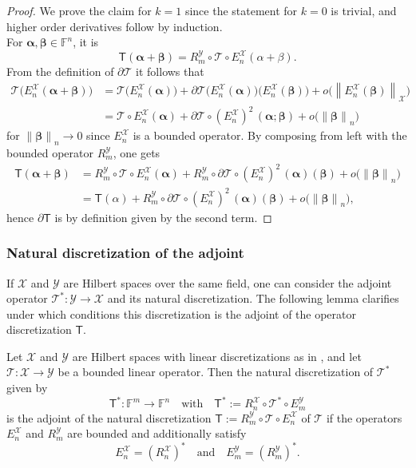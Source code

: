 \documentclass[a4paper]{paper}
\newcommand{\Spc}[1]{\mathscr{#1}}
\newcommand{\Field}{\mathbb{F}}
\newcommand{\Op}[1]{\mathcal{#1}}
\newcommand{\DiscOp}[1]{\mathsf{#1}}
\newcommand*{\EXT}[2]{\ensuremath{E_{#1}^{#2}}}
\newcommand*{\REST}[2]{\ensuremath{R_{#1}^{#2}}}
\newcommand*{\RnX}{\ensuremath{\REST{n}{\Spc{X}}}}
\newcommand*{\RmY}{\ensuremath{\REST{m}{\Spc{Y}}}}
\newcommand*{\EnX}{\ensuremath{\EXT{n}{\Spc{X}}}}
\newcommand*{\EmY}{\ensuremath{\EXT{m}{\Spc{Y}}}}
\newcommand{\valpha}{\boldsymbol{\alpha}}
\newcommand{\vbeta}{\boldsymbol{\beta}}
\newcommand*{\NORMLR}[1]{\ensuremath{\left\lVert #1 \right\rVert}}
\newcommand*{\NORM}[1]{\ensuremath{\lVert #1 \rVert}}
\begin{document}
\begin{proof}
 We prove the claim for $k=1$ since the statement for $k=0$ is trivial, and higher order derivatives follow by 
 induction.\\
 For $\valpha,\vbeta \in \Field^n$, it is
 \begin{equation*}
  \DiscOp{T}(\valpha + \vbeta) = \RmY \circ \Op{T} \circ \EnX (\alpha + \beta).
 \end{equation*}
 From the definition of $\partial \Op{T}$ it follows that
 \begin{align*}
  \Op{T}\big(\EnX(\valpha + \vbeta)\big)
  &= \Op{T}\big(\EnX(\valpha)\big) + \partial\Op{T}\big(\EnX(\valpha)\big)\big(\EnX(\vbeta)\big) +
  o\big(\NORMLR{\EnX(\vbeta)}_{\Spc{X}}\big) \\
  &= \Op{T} \circ \EnX(\valpha) + \partial\Op{T}\circ (\EnX)^2\,(\valpha; \vbeta) + o\big(\NORM{\vbeta}_n \big)
 \end{align*}
 for $\NORM{\vbeta}_n \to 0$ since $\EnX$ is a bounded operator. By composing from left with the bounded operator 
 $\RmY$, one gets
 \begin{align*}
  \DiscOp{T}(\valpha + \vbeta)
  &= \RmY \circ \Op{T} \circ \EnX(\valpha) + \RmY \circ \partial\Op{T}\circ (\EnX)^2\,(\valpha)(\vbeta) +
  o\big(\NORM{\vbeta}_n \big) 
  \\
  &= \DiscOp{T}(\alpha) + \RmY \circ \partial\Op{T}\circ (\EnX)^2\,(\valpha)(\vbeta) + o\big(\NORM{\vbeta}_n \big),
 \end{align*}
 hence $\partial\DiscOp{T}$ is by definition given by the second term.
\end{proof}


\subsubsection{Natural discretization of the adjoint}
\label{subsubsec:discr:operator:op_adj}

If $\Spc{X}$ and $\Spc{Y}$ are Hilbert spaces over the same field, one can consider the adjoint operator 
$\Op{T}^* \colon \Spc{Y} \to \Spc{X}$ and its natural discretization. The following lemma clarifies under which 
conditions this discretization is the adjoint of the operator discretization $\DiscOp{T}$.
%
\begin{lemma}
 \label{lemma:discr:operator:op_adj:natural_is_adj}
 Let $\Spc{X}$ and $\Spc{Y}$ are Hilbert spaces with linear discretizations as in 
 , and let $\Op{T} \colon \Spc{X} \to \Spc{Y}$ be a bounded linear operator. 
 Then the natural discretization of $\Op{T}^*$ given by
 \begin{equation*}
  \DiscOp{T}^* \colon \Field^m \to \Field^n
  \quad \text{with} \quad
  \DiscOp{T}^* := \RnX \circ \Op{T}^* \circ \EmY
 \end{equation*}
 is the adjoint of the natural discretization $\DiscOp{T} := \RmY \circ \Op{T} \circ \EnX$ of $\Op{T}$ if the operators 
 $\EnX$ and $\RmY$ are bounded and additionally satisfy
 \begin{equation*}
  \EnX = (\RnX)^* \quad \text{and} \quad \EmY = (\RmY)^*.
 \end{equation*}
\end{lemma}
\end{document}
